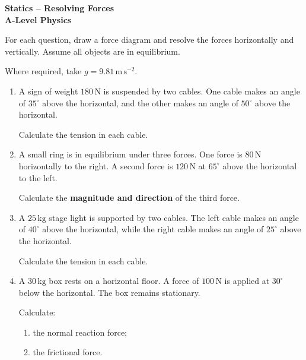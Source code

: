 \documentclass[12pt,a4paper]{article}
\begin{document}
\begin{center}
    {\Large\textbf{Statics -- Resolving Forces}}\\[4pt]
    \textbf{A-Level Physics}
\end{center}

For each question, draw a force diagram and resolve the forces
horizontally and vertically. Assume all objects are in equilibrium.

Where required, take \(g = 9.81\,\mathrm{m\,s^{-2}}\).

\vspace{0.5cm}

\begin{enumerate}[leftmargin=*, itemsep=1em]

\item
A sign of weight \(180\,\mathrm{N}\) is suspended by two cables.
One cable makes an angle of \(35^\circ\) above the horizontal,
and the other makes an angle of \(50^\circ\) above the horizontal.

Calculate the tension in each cable.

\vspace{1.2cm}

\item
A small ring is in equilibrium under three forces.
One force is \(80\,\mathrm{N}\) horizontally to the right.
A second force is \(120\,\mathrm{N}\) at \(65^\circ\) above
the horizontal to the left.

Calculate the \textbf{magnitude and direction} of the third force.

\vspace{1.2cm}

\item
A \(25\,\mathrm{kg}\) stage light is supported by two cables.
The left cable makes an angle of \(40^\circ\) above the horizontal,
while the right cable makes an angle of \(25^\circ\) above the horizontal.

Calculate the tension in each cable.

\vspace{1.2cm}

\item
A \(30\,\mathrm{kg}\) box rests on a horizontal floor.
A force of \(100\,\mathrm{N}\) is applied at \(30^\circ\)
below the horizontal. The box remains stationary.

Calculate:

\begin{enumerate}[label=(\alph*)]
    \item the normal reaction force;
    \item the frictional force.
\end{enumerate}


\end{enumerate}
\end{document}
